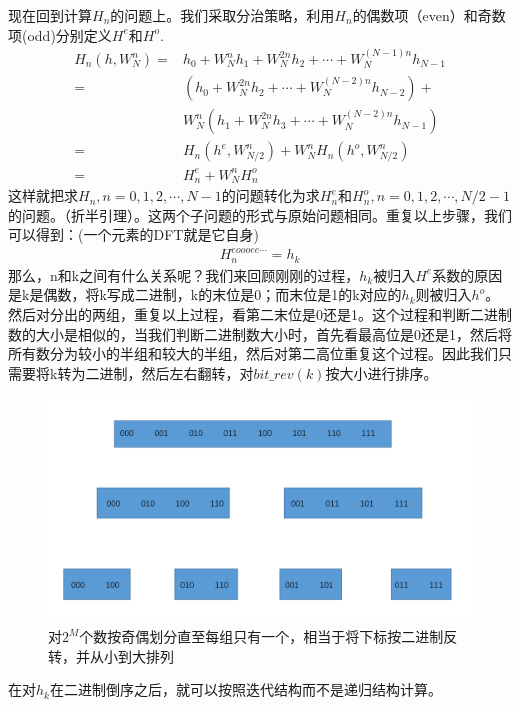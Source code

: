 现在回到计算$H_n$的问题上。我们采取分治策略，利用$H_n$的偶数项（even）和奇数项(odd)分别定义$H^e$和$H^o$.
\begin{equation}
    \begin{aligned}
        H_n(h,W_N^n)=&h_0+W_N^{n}h_1+W_N^{2n}h_2+\cdots+W_N^{(N-1)n}h_{N-1}\\
            =&(h_0+W_N^{2n}h_2+\cdots+W_N^{(N-2)n}h_{N-2})+\\
            &W_N^n(h_1+W_N^{2n}h_3+\cdots+W_N^{(N-2)n}h_{N-1})\\
            =&H_n(h^e,W_{N/2}^n)+W_N^nH_n(h^o,W_{N/2}^n)\\
            =&H_n^e+W_N^nH_n^o
    \end{aligned}
\end{equation}
这样就把求$H_n,n=0,1,2,\cdots,N-1$的问题转化为求$H_n^e$和$H_n^o,n=0,1,2,\cdots,N/2-1$的问题。（折半引理）。这两个子问题的形式与原始问题相同。重复以上步骤，我们可以得到：(一个元素的DFT就是它自身)
\begin{align}
    H^{eoooee\cdots}_n=h_k
\end{align}
那么，n和k之间有什么关系呢？我们来回顾刚刚的过程，$h_k$被归入$H^e$系数的原因是k是偶数，将k写成二进制，k的末位是0；而末位是1的k对应的$h_k$则被归入$h^o$。然后对分出的两组，重复以上过程，看第二末位是0还是1。这个过程和判断二进制数的大小是相似的，当我们判断二进制数大小时，首先看最高位是0还是1，然后将所有数分为较小的半组和较大的半组，然后对第二高位重复这个过程。因此我们只需要将k转为二进制，然后左右翻转，对$bit\_rev(k)$按大小进行排序。
\begin{figure}[h]
    \centering
    \includegraphics[width=\linewidth]{figures/FFT2}
    \caption{对$2^M$个数按奇偶划分直至每组只有一个，相当于将下标按二进制反转，并从小到大排列}
\end{figure}
在对$h_k$在二进制倒序之后，就可以按照迭代结构而不是递归结构计算。

